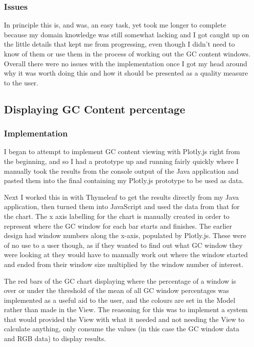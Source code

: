 \subsubsection{Issues}
In principle this is, and was, an easy task, yet took me longer to complete because my domain knowledge was still somewhat lacking and I got caught up on the little details that kept me from progressing, even though I didn't need to know of them or use them in the process of working out the GC content windows. Overall there were no issues with the implementation once I got my head around why it was worth doing this and how it should be presented as a quality measure to the user.

\subsection{Displaying GC Content percentage}
\subsubsection{Implementation}
I began to attempt to implement GC content viewing with Plotly.js right from the beginning, and so I had a prototype up and running fairly quickly where I manually took the results from the console output of the Java application and pasted them into the final containing my Plotly.js prototype to be used as data. 

Next I worked this in with Thymeleaf to get the results directly from my Java application, then turned them into JavaScript and used the data from that for the chart. The x axis labelling for the chart is manually created in order to represent where the GC window for each bar starts and finishes. The earlier design had window numbers along the x-axis, populated by Plotly.js. These were of no use to a user though, as if they wanted to find out what GC window they were looking at they would have to manually work out where the window started and ended from their window size multiplied by the window number of interest.

The red bars of the GC chart displaying where the percentage of a window is over or under the threshold of the mean of all GC window percentages was implemented as a useful aid to the user, and the colours are set in the Model rather than made in the View. The reasoning for this was to implement a system that would provided the View with what it needed and not needing the View to calculate anything, only consume the values (in this case the GC window data and RGB data) to display results.

